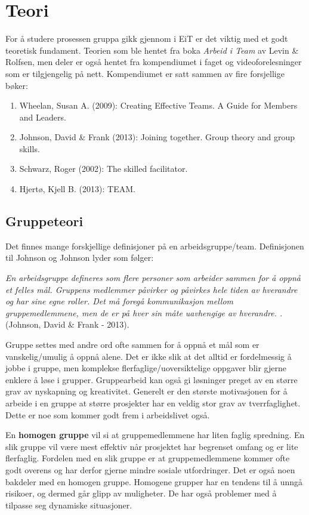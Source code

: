 \section{Teori}
For å studere prosessen gruppa gikk gjennom i EiT er det viktig med et godt teoretisk fundament. 
Teorien som ble hentet fra boka \textit{Arbeid i Team} av Levin \& Rolfsen, men deler er også hentet fra kompendiumet i faget og videoforelesninger som er tilgjengelig på nett. 
Kompendiumet er satt sammen av fire forsjellige bøker:
\begin{enumerate}
    \item Wheelan, Susan A. (2009): Creating Effective Teams. A Guide for Members and Leaders.
    \item Johnson, David \& Frank (2013): Joining together. Group theory and group skills.
    \item Schwarz, Roger (2002): The skilled facilitator. 
    \item Hjertø, Kjell B. (2013): TEAM.
\end{enumerate}

\subsection{Gruppeteori}
Det finnes mange forskjellige definisjoner på en arbeidsgruppe/team. 
Definisjonen til Johnson og Johnson lyder som følger:

\begin{center}
\textit{En arbeidsgruppe defineres som flere personer som arbeider sammen for å oppnå et felles mål. 
Gruppens medlemmer påvirker og påvirkes hele tiden av hverandre og har sine egne roller. 
Det må foregå kommunikasjon mellom gruppemedlemmene, men de er på hver sin måte uavhengige av hverandre. .} 
(Johnson, David \& Frank - 2013).
\end{center}

Gruppe settes med andre ord ofte sammen for å oppnå et mål som er vanskelig/umulig å oppnå alene. 
Det er ikke slik at det alltid er fordelmessig å jobbe i gruppe, men komplekse flerfaglige/uoversiktelige oppgaver blir gjerne enklere å løse i grupper.
Gruppearbeid kan også gi løsninger preget av en større grav av nyskapning og kreativitet. 
Generelt er den største motivasjonen for å arbeide i en gruppe at større prosjekter har en veldig stor grav av tverrfaglighet. 
Dette er noe som kommer godt frem i arbeidslivet også. 

En \textbf{homogen gruppe} vil si at gruppemedlemmene har liten faglig spredning. 
En slik gruppe vil være mest effektiv når prosjektet har begrenset omfang og er lite flerfaglig. 
Fordelen med en slik gruppe er at gruppemedlemmene kommer ofte godt overens og har derfor gjerne mindre sosiale utfordringer. 
Det er også noen bakdeler med en homogen gruppe. 
Homogene grupper har en tendens til å unngå risikoer, og dermed går glipp av muligheter. 
De har også problemer med å tilpasse seg dynamiske situasjoner.

